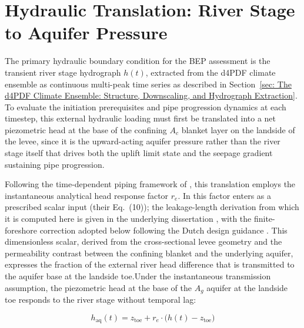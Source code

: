 \section{Hydraulic Translation: River Stage to Aquifer Pressure}
\label{sec: Hydraulic Translation: River Stage to Aquifer Pressure}

The primary hydraulic boundary condition for the BEP assessment is the transient river
stage hydrograph $h(t)$, extracted from the d4PDF climate ensemble as continuous
multi-peak time series as described in Section~\ref{sec: The d4PDF Climate Ensemble:
Structure, Downscaling, and Hydrograph Extraction}. To evaluate the initiation
prerequisites and pipe progression dynamics at each timestep, this external hydraulic
loading must first be translated into a net piezometric head at the base of the confining
$A_c$ blanket layer on the landside of the levee, since it is the upward-acting aquifer
pressure rather than the river stage itself that drives both the uplift limit state and
the seepage gradient sustaining pipe progression.

Following the time-dependent piping framework of \textcite{pol_sie_2024}, this
translation employs the instantaneous analytical head response factor $r_e$. In
\textcite{pol_sie_2024} this factor enters as a prescribed scalar input (their
Eq.~(10)); the leakage-length derivation from which it is computed here is given in the underlying dissertation \parencite[Eq.~7.13]{pol_thesis_2022}, with the
finite-foreshore correction adopted below following the Dutch design guidance
\parencite{TRZmw1999, TAW2004}. This dimensionless scalar, derived from the
cross-sectional levee geometry and the permeability contrast between the confining
blanket and the underlying aquifer, expresses the fraction of the external river head
difference that is transmitted to the aquifer base at the landside toe.Under
the instantaneous transmission assumption, the piezometric head at the base of the $A_g$
aquifer at the landside toe responds to the river stage without temporal lag:

$$h_\mathrm{aq}(t) = z_\mathrm{toe} + r_e \cdot \bigl(h(t) - z_\mathrm{toe}\bigr)$$

